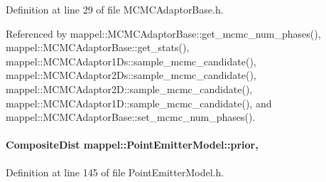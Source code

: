 Definition at line 29 of file M\+C\+M\+C\+Adaptor\+Base.\+h.



Referenced by mappel\+::\+M\+C\+M\+C\+Adaptor\+Base\+::get\+\_\+mcmc\+\_\+num\+\_\+phases(), mappel\+::\+M\+C\+M\+C\+Adaptor\+Base\+::get\+\_\+stats(), mappel\+::\+M\+C\+M\+C\+Adaptor1\+Ds\+::sample\+\_\+mcmc\+\_\+candidate(), mappel\+::\+M\+C\+M\+C\+Adaptor2\+Ds\+::sample\+\_\+mcmc\+\_\+candidate(), mappel\+::\+M\+C\+M\+C\+Adaptor2\+D\+::sample\+\_\+mcmc\+\_\+candidate(), mappel\+::\+M\+C\+M\+C\+Adaptor1\+D\+::sample\+\_\+mcmc\+\_\+candidate(), and mappel\+::\+M\+C\+M\+C\+Adaptor\+Base\+::set\+\_\+mcmc\+\_\+num\+\_\+phases().

\paragraph[{\texorpdfstring{prior}{prior}}]{\setlength{\rightskip}{0pt plus 5cm}Composite\+Dist mappel\+::\+Point\+Emitter\+Model\+::prior\hspace{0.3cm}{\ttfamily [protected]}, {\ttfamily [inherited]}}\hypertarget{classmappel_1_1PointEmitterModel_a393839f8eb1dd3d61c9369377742ba0e}{}\label{classmappel_1_1PointEmitterModel_a393839f8eb1dd3d61c9369377742ba0e}


Definition at line 145 of file Point\+Emitter\+Model.\+h.



